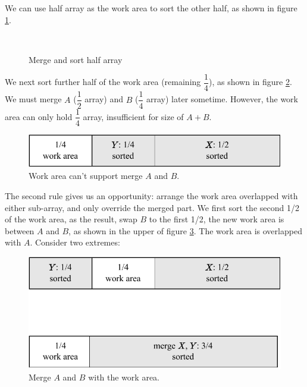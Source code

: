 \documentclass[b5paper]{article}
\begin{document}
We can use half array as the work area to sort the other half, as shown in figure \ref{fig:merge-in-place-start}.

\begin{figure}[htbp]
 \centering
       \\
 \caption{Merge and sort half array}
 \label{fig:merge-in-place-start}
\end{figure}

We next sort further half of the work area (remaining $\dfrac{1}{4}$), as shown in figure \ref{fig:merge-in-place-quater}. We must merge $A$ ($\dfrac{1}{2}$ array) and $B$ ($\dfrac{1}{4}$ array) later sometime. However, the work area can only hold $\dfrac{1}{4}$ array, insufficient for size of $A + B$.

\begin{figure}[htbp]
 \centering
 \includegraphics[scale=0.8]{img/workarea-1}
 \caption{Work area can't support merge $A$ and $B$.}
 \label{fig:merge-in-place-quater}
\end{figure}

The second rule gives us an opportunity: arrange the work area overlapped with either sub-array, and only override the merged part. We first sort the second 1/2 of the work area, as the result, swap $B$ to the first 1/2, the new work area is between $A$ and $B$, as shown in the upper of figure \ref{fig:merge-in-place-setup}. The work area is overlapped with $A$\cite{msort-in-place}. Consider two extremes:

\begin{figure}[htbp]
 \centering
 \includegraphics[scale=0.8]{img/workarea-2}
 \caption{Merge $A$ and $B$ with the work area.}
 \label{fig:merge-in-place-setup}
\end{figure}
\end{document}
